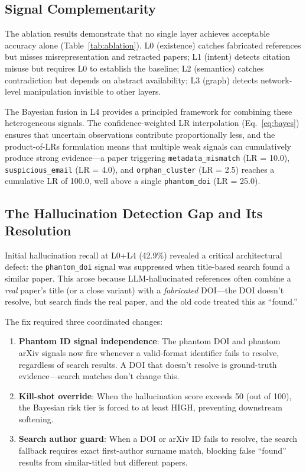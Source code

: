 \documentclass[sigconf,nonacm]{acmart}
\begin{document}
\subsection{Signal Complementarity}

The ablation results demonstrate that no single layer achieves acceptable accuracy alone (Table~\ref{tab:ablation}).
L0 (existence) catches fabricated references but misses misrepresentation and retracted papers; L1 (intent) detects citation misuse but requires L0 to establish the baseline; L2 (semantics) catches contradiction but depends on abstract availability; L3 (graph) detects network-level manipulation invisible to other layers.

The Bayesian fusion in L4 provides a principled framework for combining these heterogeneous signals.
The confidence-weighted LR interpolation (Eq.~\ref{eq:bayes}) ensures that uncertain observations contribute proportionally less, and the product-of-LRs formulation means that multiple weak signals can cumulatively produce strong evidence---a paper triggering \texttt{metadata\_mismatch} (LR = 10.0), \texttt{suspicious\_email} (LR = 4.0), and \texttt{orphan\_cluster} (LR = 2.5) reaches a cumulative LR of 100.0, well above a single \texttt{phantom\_doi} (LR = 25.0).

\subsection{The Hallucination Detection Gap and Its Resolution}

Initial hallucination recall at L0+L4 (42.9\%) revealed a critical architectural defect: the \texttt{phantom\_doi} signal was suppressed when title-based search found a similar paper.
This arose because LLM-hallucinated references often combine a \emph{real} paper's title (or a close variant) with a \emph{fabricated} DOI---the DOI doesn't resolve, but search finds the real paper, and the old code treated this as ``found.''

The fix required three coordinated changes:
\begin{enumerate}[leftmargin=*]
    \item \textbf{Phantom ID signal independence}: The phantom DOI and phantom arXiv signals now fire whenever a valid-format identifier fails to resolve, regardless of search results. A DOI that doesn't resolve is ground-truth evidence---search matches don't change this.
    \item \textbf{Kill-shot override}: When the hallucination score exceeds 50 (out of 100), the Bayesian risk tier is forced to at least HIGH, preventing downstream softening.
    \item \textbf{Search author guard}: When a DOI or arXiv ID fails to resolve, the search fallback requires exact first-author surname match, blocking false ``found'' results from similar-titled but different papers.
\end{enumerate}
\end{document}
